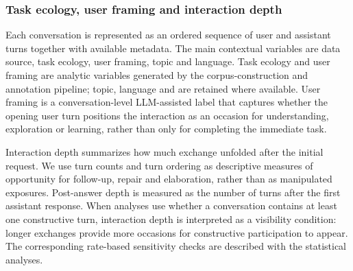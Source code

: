 \subsubsection{Task ecology, user framing and interaction depth}

Each conversation is represented as an ordered sequence of user and assistant turns together with available metadata. The main contextual variables are data source, task ecology, user framing, topic and language. Task ecology and user framing are analytic variables generated by the corpus-construction and annotation pipeline; topic, language and  are retained where available. User framing is a conversation-level LLM-assisted label that captures whether the
opening user turn positions the interaction as an occasion for understanding, exploration or learning, rather than only for completing the immediate task.

Interaction depth summarizes how much exchange unfolded after the initial request. We use turn counts and turn ordering as descriptive measures of opportunity for follow-up, repair and elaboration, rather than as manipulated exposures. Post-answer
depth is measured as the number of turns after the first assistant response. When analyses use whether a conversation contains at least one constructive turn, interaction
depth is interpreted as a visibility condition: longer exchanges provide more occasions for constructive participation to appear. The corresponding rate-based sensitivity checks
are described with the statistical analyses.






